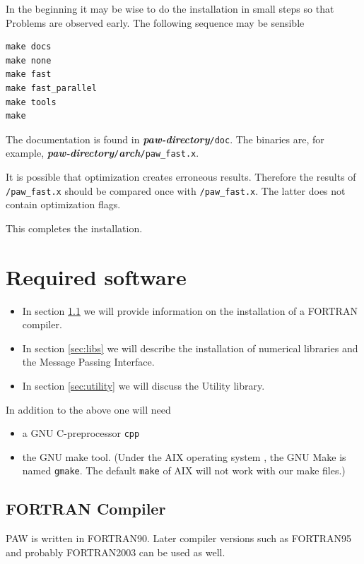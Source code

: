 \documentclass[a4paper,10pt]{report}
\newcommand{\myspec}[1]{\textbf{\textit{#1}}}
\newcommand{\mytt}[1]{{\tt #1}}
\begin{document}
In the beginning it may be wise to do the installation in small steps
so that Problems are observed early. The following sequence may be sensible
\begin{verbatim}
make docs
make none
make fast
make fast_parallel
make tools
make 
\end{verbatim}

The documentation is found in \myspec{paw-directory}\mytt{/doc}.  The
binaries are, for example,
\myspec{paw-directory}\mytt{/}\myspec{arch}\mytt{/paw\_fast.x}.

It is possible that optimization creates erroneous results. Therefore
the results of \mytt{/paw\_fast.x} should be compared once with
\mytt{/paw\_fast.x}. The latter does not contain optimization flags.

This completes the installation.



\chapter{Required software}
\label{sec:software}
\begin{itemize}
\item In section \ref{sec:compiler} we will provide information on the
installation of a FORTRAN compiler.
\item In section \ref{sec:libs} we will describe the installation of
numerical libraries and the Message Passing Interface.
\item  In section \ref{sec:utility} we will discuss the Utility library.
\end{itemize}

\noindent In addition to the above one will need
\begin{itemize}
\item a GNU C-preprocessor \mytt{cpp}
\item the GNU make tool. (Under the AIX operating system , the GNU
Make is named \mytt{gmake}. The default \mytt{make} of AIX will not
work with our make files.)
\end{itemize}

\section{FORTRAN Compiler}
\label{sec:compiler}
PAW is written in FORTRAN90. Later compiler versions such as FORTRAN95
and probably FORTRAN2003 can be used as well. 
\end{document}
